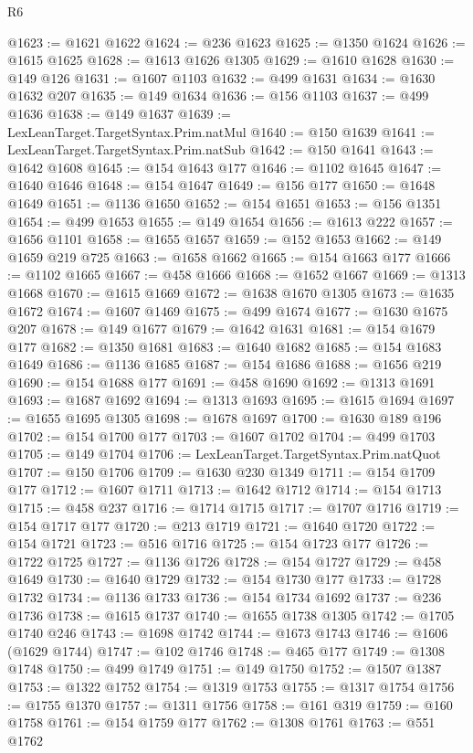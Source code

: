 \begin{lexlean}{R6}
\begin{coremodule}
@1623 := @1621 @1622
@1624 := @236 @1623
@1625 := @1350 @1624
@1626 := @1615 @1625
@1628 := @1613 @1626 @1305
@1629 := @1610 @1628
@1630 := @149 @126
@1631 := @1607 @1103
@1632 := @499 @1631
@1634 := @1630 @1632 @207
@1635 := @149 @1634
@1636 := @156 @1103
@1637 := @499 @1636
@1638 := @149 @1637
@1639 := LexLeanTarget.TargetSyntax.Prim.natMul
@1640 := @150 @1639
@1641 := LexLeanTarget.TargetSyntax.Prim.natSub
@1642 := @150 @1641
@1643 := @1642 @1608
@1645 := @154 @1643 @177
@1646 := @1102 @1645
@1647 := @1640 @1646
@1648 := @154 @1647
@1649 := @156 @177
@1650 := @1648 @1649
@1651 := @1136 @1650
@1652 := @154 @1651
@1653 := @156 @1351
@1654 := @499 @1653
@1655 := @149 @1654
@1656 := @1613 @222
@1657 := @1656 @1101
@1658 := @1655 @1657
@1659 := @152 @1653
@1662 := @149 @1659 @219 @725
@1663 := @1658 @1662
@1665 := @154 @1663 @177
@1666 := @1102 @1665
@1667 := @458 @1666
@1668 := @1652 @1667
@1669 := @1313 @1668
@1670 := @1615 @1669
@1672 := @1638 @1670 @1305
@1673 := @1635 @1672
@1674 := @1607 @1469
@1675 := @499 @1674
@1677 := @1630 @1675 @207
@1678 := @149 @1677
@1679 := @1642 @1631
@1681 := @154 @1679 @177
@1682 := @1350 @1681
@1683 := @1640 @1682
@1685 := @154 @1683 @1649
@1686 := @1136 @1685
@1687 := @154 @1686
@1688 := @1656 @219
@1690 := @154 @1688 @177
@1691 := @458 @1690
@1692 := @1313 @1691
@1693 := @1687 @1692
@1694 := @1313 @1693
@1695 := @1615 @1694
@1697 := @1655 @1695 @1305
@1698 := @1678 @1697
@1700 := @1630 @189 @196
@1702 := @154 @1700 @177
@1703 := @1607 @1702
@1704 := @499 @1703
@1705 := @149 @1704
@1706 := LexLeanTarget.TargetSyntax.Prim.natQuot
@1707 := @150 @1706
@1709 := @1630 @230 @1349
@1711 := @154 @1709 @177
@1712 := @1607 @1711
@1713 := @1642 @1712
@1714 := @154 @1713
@1715 := @458 @237
@1716 := @1714 @1715
@1717 := @1707 @1716
@1719 := @154 @1717 @177
@1720 := @213 @1719
@1721 := @1640 @1720
@1722 := @154 @1721
@1723 := @516 @1716
@1725 := @154 @1723 @177
@1726 := @1722 @1725
@1727 := @1136 @1726
@1728 := @154 @1727
@1729 := @458 @1649
@1730 := @1640 @1729
@1732 := @154 @1730 @177
@1733 := @1728 @1732
@1734 := @1136 @1733
@1736 := @154 @1734 @1692
@1737 := @236 @1736
@1738 := @1615 @1737
@1740 := @1655 @1738 @1305
@1742 := @1705 @1740 @246
@1743 := @1698 @1742
@1744 := @1673 @1743
@1746 := @1606 (@1629 @1744)
@1747 := @102 @1746
@1748 := @465 @177
@1749 := @1308 @1748
@1750 := @499 @1749
@1751 := @149 @1750
@1752 := @1507 @1387
@1753 := @1322 @1752
@1754 := @1319 @1753
@1755 := @1317 @1754
@1756 := @1755 @1370
@1757 := @1311 @1756
@1758 := @161 @319
@1759 := @160 @1758
@1761 := @154 @1759 @177
@1762 := @1308 @1761
@1763 := @551 @1762

\end{coremodule}
\end{lexlean}
